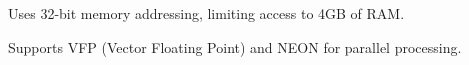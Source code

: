 \bigskip

\begin{NxSSSSBox}
	\begin{NxIDBox}
		Uses 32-bit memory addressing, limiting access to 4GB of RAM.
	\end{NxIDBox}
\end{NxSSSSBox}

\begin{NxSSSSBox}
	\begin{NxIDBox}
		Supports VFP (Vector Floating Point) and NEON for parallel processing.
	\end{NxIDBox}
\end{NxSSSSBox}

